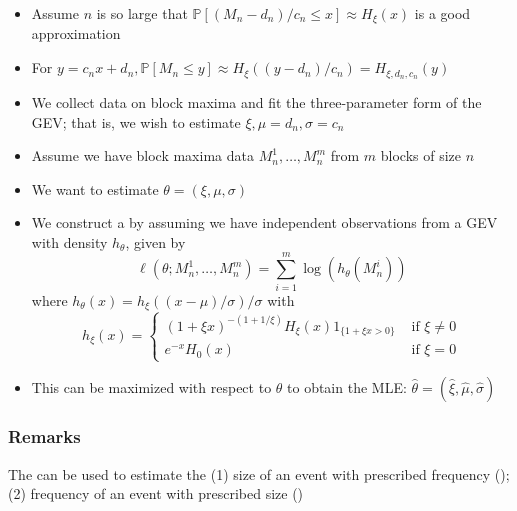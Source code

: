 \begin{itemize}[leftmargin=*]
    \item Assume $n$ is so large that $\mathbb{P}\left[\left(M_{n}-d_{n}\right) / c_{n} \leq x\right] \approx H_{\xi}(x)$ is a good approximation
    \item For $y=c_{n} x+d_{n}, \mathbb{P}\left[M_{n} \leq y\right] \approx H_{\xi}\left(\left(y-d_{n}\right) / c_{n}\right)=H_{\xi, d_{n}, c_{n}}(y)$
    \item We collect data on block maxima and fit the three-parameter form of the GEV; that is, we wish to estimate $\xi, \mu=d_{n}, \sigma=c_{n}$
    \item Assume we have block maxima data $M_{n}^{1}, \ldots, M_{n}^{m}$ from $m$ blocks of size $n$
    \item We want to estimate $\theta=(\xi, \mu, \sigma)$
    \item We construct a  by assuming we have independent observations from a GEV with density $h_{\theta}$, given by
$$
\ell\left(\theta ; M_{n}^{1}, \ldots, M_{n}^{m}\right)=\sum_{i=1}^{m} \log \left(h_{\theta}\left(M_{n}^{i}\right)\right)
$$
where $h_{\theta}(x)=h_{\xi}((x-\mu) / \sigma) / \sigma$ with
$$
h_{\xi}(x)= \begin{cases}(1+\xi x)^{-(1+1 / \xi)} H_{\xi}(x) 1_{\{1+\xi x>0\}} & \text { if } \xi \neq 0 \\ e^{-x} H_{0}(x) & \text { if } \xi=0\end{cases}
$$
    \item This can be maximized with respect to $\theta$ to obtain the MLE: $\hat{\theta}=(\hat{\xi}, \hat{\mu}, \hat{\sigma})$
\end{itemize}




\subsubsection*{Remarks}
The  can be used to estimate the 
(1) size of an event with prescribed frequency (); 
(2) frequency of an event with prescribed size ()

